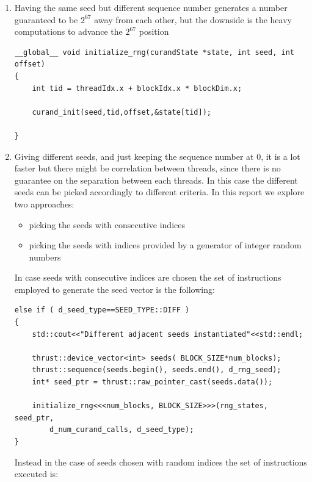 \documentclass[a4paper,10pt]{article}
\begin{document}
\begin{enumerate}
 \item Having the same seed but different sequence number generates a number 
guaranteed 
to be $2^{67}$ away from each other, 
but the downside is the heavy computations to advance the $2^{67}$ position

\hspace*{-2cm}
\begin{lstlisting}
__global__ void initialize_rng(curandState *state, int seed, int offset)
{
    int tid = threadIdx.x + blockIdx.x * blockDim.x;

    curand_init(seed,tid,offset,&state[tid]);

}
\end{lstlisting}

\item Giving different seeds, and just keeping the sequence number at 0, 
it is a lot faster but there might be correlation between threads, since there 
is 
no 
guarantee on the separation between each threads. In this case the different 
seeds can be picked accordingly to different criteria. In this report we 
explore two approaches:
\begin{itemize}
 \item picking the seeds with consecutive indices
 \item picking the seeds with indices provided by a generator of integer random 
numbers
\end{itemize}

In case seeds with consecutive indices are chosen the set of instructions 
employed to generate the seed vector is the following:

\hspace*{-2cm}
\begin{lstlisting}
else if ( d_seed_type==SEED_TYPE::DIFF )
{
    std::cout<<"Different adjacent seeds instantiated"<<std::endl;

    thrust::device_vector<int> seeds( BLOCK_SIZE*num_blocks);
    thrust::sequence(seeds.begin(), seeds.end(), d_rng_seed);
    int* seed_ptr = thrust::raw_pointer_cast(seeds.data());

    initialize_rng<<<num_blocks, BLOCK_SIZE>>>(rng_states, seed_ptr,
        d_num_curand_calls, d_seed_type);
}

\end{lstlisting}

Instead in the case of seeds chosen with random indices the set of instructions 
executed is:


\end{enumerate}
\end{document}
